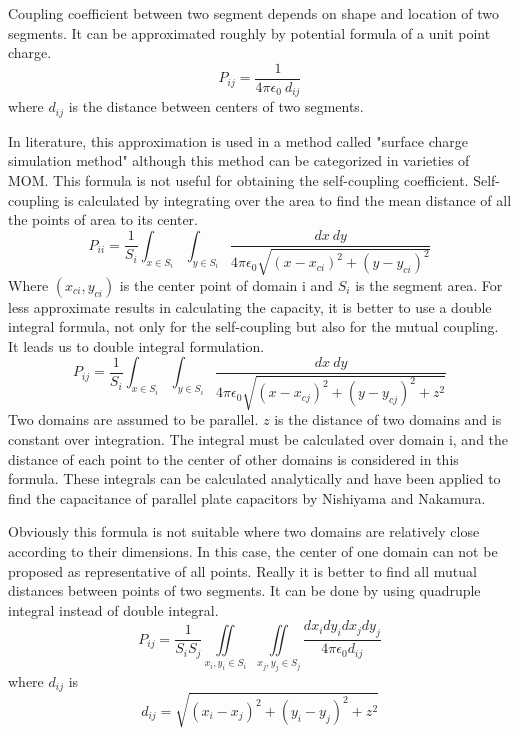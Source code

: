 \documentclass[final,5p,times,twocolumn]{elsarticle}
\begin{document}
Coupling coefficient between two segment depends on shape and location of two segments. It can be approximated roughly by potential formula of a unit point charge. 
\begin{equation}
\label{eq3}
P_{ij} = \frac{1}{4 \pi \epsilon_0\  d_{ij}}
\end{equation}
where $d_{ij}$ is the distance between centers of two segments.


In literature, this approximation is used in a method called "surface charge simulation method"\cite {Zhou1993} although this method can be categorized in varieties of MOM. This formula is not useful for obtaining the self-coupling coefficient. Self-coupling is calculated by integrating over the area to find the mean distance of all the points of area to its center.
\begin{equation}
\label{eq4}
P_{ii} = \frac 1 {S_i} \int_{x \in S_i} \int_{y \in S_i} \frac {dx\  dy}{4 \pi \epsilon_0 \sqrt{(x-x_{ci})^2 + (y-y_{ci})^2}}
\end{equation}
Where $(x_{ci}, y_{ci})$ is the center point of domain i and $S_i $ is the segment area.
For less approximate results in calculating the capacity, it is better to use a double integral formula, not only for the self-coupling but also for the mutual coupling. It leads us to double integral formulation.
\begin{equation}
\label{eq5}
P_{ij} = \frac 1 {S_i}\int_{x \in S_i} \int_{y \in S_i} \frac {dx\  dy}{4 \pi \epsilon_0 \sqrt{(x-x_{cj})^2 + (y-y_{cj})^2+ z^2}}
\end{equation}
Two domains are assumed to be parallel. $z$ is the distance of two domains and is constant over integration. The integral must be calculated over domain i, and the distance of each point to the center of other domains is considered in this formula. These integrals can be calculated analytically and have been applied to find the capacitance of parallel plate capacitors by Nishiyama and Nakamura\cite {Nishiyama1994}.

Obviously this formula is not suitable where two domains are relatively close according to their dimensions. In this case, the center of one domain can not be proposed as representative of all points. Really it is better to find all mutual distances between points of two segments. It can be done by using quadruple integral instead of double integral.
\begin{equation}
\label {eq6}
P_{ij} = \frac 1 {S_i S_j}\iint\limits_{x_i, y_i \in S_i}\ \  \iint\limits_{x_j, y_j \in S_j}  \frac{dx_i dy_i dx_j dy_j}{4 \pi \epsilon_0 d_{ij}}
\end{equation} 
where $d _{ij}$ is 
\begin{equation}
\label {eq7}
d_{ij} = \sqrt{(x_i-x_j)^2 + (y_i-y_j)^2 + z^2}
\end{equation} 
\end{document}
